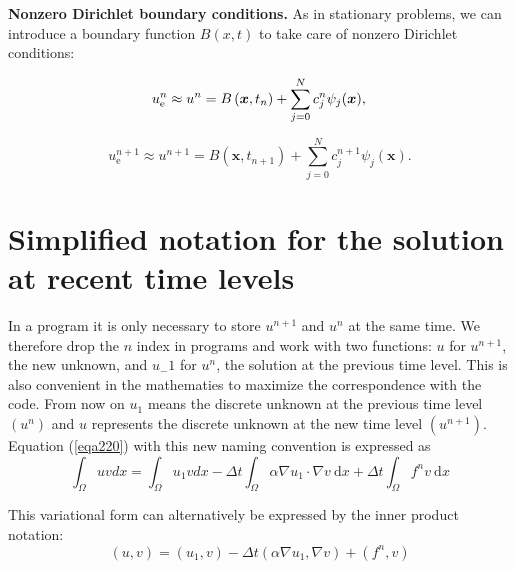 \documentclass[../main.tex]{subfiles}
\begin{document}
		
		\begin{mybox}
		\textbf{Nonzero Dirichlet boundary conditions.}	
			\noindent As in stationary problems, we can introduce a boundary function $B(x, t)$ to take care of nonzero Dirichlet conditions:
			
			\begin{equation}
				\label{eqa221}	
				u_{\mathrm{e}}^{n} \approx u^{n}=B\left(\boldsymbol{x}, t_{n}\right)+\sum_{j=0}^{N} c_{j}^{n} \psi_{j}(\boldsymbol{x}), \\
			\end{equation}
		
			\begin{equation}
				\label{eqa222}	
				u_{\mathrm{e}}^{n+1} \approx u^{n+1}=B\left(\boldsymbol{x}, t_{n+1}\right)+\sum_{j=0}^{N} c_{j}^{n+1} \psi_{j}(\boldsymbol{x}) .
			\end{equation}
			
		\end{mybox}
		
		
	\section[Simplified notation for the solution at recent time levels]{Simplified notation for the solution at recent time levels}
		\label{sec:sec_19_3}
		\noindent In a program it is only necessary to store $u^{n+1}$ and $u^{n}$ at the same time. We therefore drop the $n$ index in programs and work with two functions: $u$ for $u^{n+1}$, the new unknown, and $u_{-} 1$ for $u^{n}$, the solution at the previous time level. This is also convenient in the mathematies to maximize the correspondence with the code. From now on $u_{1}$ means the discrete unknown at the previous time level $\left(u^{n}\right)$ and $u$ represents the discrete unknown at the new time level $\left(u^{n+1}\right)$. Equation (\ref{eqa220}) with this new naming convention is expressed as
		\begin{equation}
			\label{eqa223}	
			\int_{\Omega} u v d x=\int_{\Omega} u_{1} v d x-\Delta t \int_{\Omega} \alpha \nabla u_{1} \cdot \nabla v \mathrm{~d} x+\Delta t \int_{\Omega} f^{n} v \mathrm{~d} x
		\end{equation}
	
		This variational form can alternatively be expressed by the inner product notation:
		\begin{equation}
			\label{eqa224}	
			(u, v)=\left(u_{1}, v\right)-\Delta t\left(\alpha \nabla u_{1}, \nabla v\right)+\left(f^{n}, v\right)
		\end{equation}
	
\end{document}
